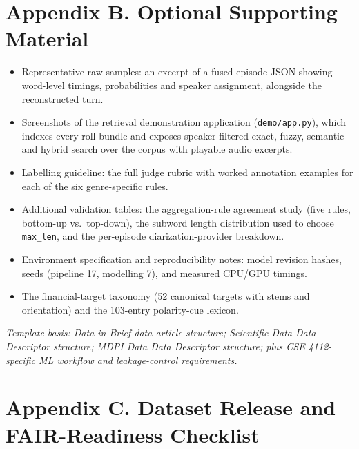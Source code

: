 \documentclass[11pt,a4paper]{article}
\begin{document}
\vspace{8pt}
\section*{\sffamily Appendix B. Optional Supporting Material}

\begin{itemize}[leftmargin=1.4em,itemsep=2pt,topsep=2pt]
  \item Representative raw samples: an excerpt of a fused episode JSON showing word-level timings,
        probabilities and speaker assignment, alongside the reconstructed turn.
  \item Screenshots of the retrieval demonstration application (\texttt{demo/app.py}), which
        indexes every roll bundle and exposes speaker-filtered exact, fuzzy, semantic and hybrid
        search over the corpus with playable audio excerpts.
  \item Labelling guideline: the full judge rubric with worked annotation examples for each of the
        six genre-specific rules.
  \item Additional validation tables: the aggregation-rule agreement study (five rules, bottom-up
        vs.\ top-down), the subword length distribution used to choose \texttt{max\_len}, and the
        per-episode diarization-provider breakdown.
  \item Environment specification and reproducibility notes: model revision hashes, seeds
        (pipeline 17, modelling 7), and measured CPU/GPU timings.
  \item The financial-target taxonomy (52 canonical targets with stems and orientation) and the
        103-entry polarity-cue lexicon.
\end{itemize}

\vspace{4pt}
{\small\emph{Template basis: Data in Brief data-article structure; Scientific Data Data Descriptor
structure; MDPI Data Data Descriptor structure; plus CSE 4112-specific ML workflow and
leakage-control requirements.}}

\vspace{8pt}
\section*{\sffamily Appendix C. Dataset Release and FAIR-Readiness Checklist}
\end{document}
